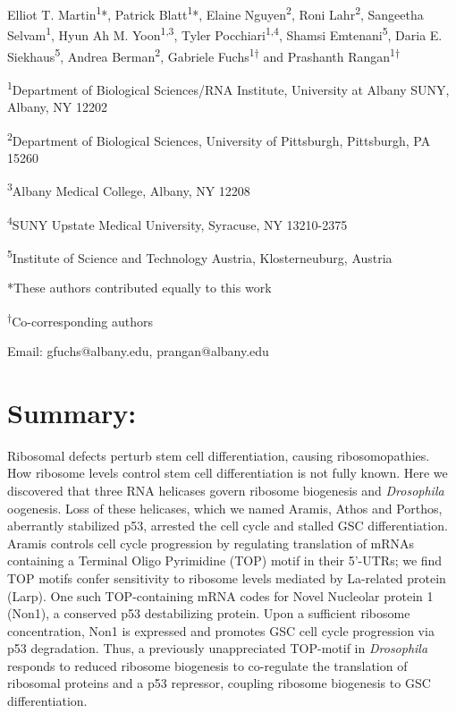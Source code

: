\documentclass[12pt,oneside]{reedthesis}
\begin{document}
Elliot T. Martin\textsuperscript{1}*, Patrick Blatt\textsuperscript{1}*, Elaine Nguyen\textsuperscript{2}, Roni Lahr\textsuperscript{2}, Sangeetha Selvam\textsuperscript{1}, Hyun Ah M. Yoon\textsuperscript{1,3}, Tyler Pocchiari\textsuperscript{1,4}, Shamsi Emtenani\textsuperscript{5}, Daria E. Siekhaus\textsuperscript{5}, Andrea Berman\textsuperscript{2}, Gabriele Fuchs\textsuperscript{1†} and Prashanth Rangan\textsuperscript{1†}

\textsuperscript{1}Department of Biological Sciences/RNA Institute, University at Albany SUNY, Albany, NY 12202

\textsuperscript{2}Department of Biological Sciences, University of Pittsburgh, Pittsburgh, PA 15260

\textsuperscript{3}Albany Medical College, Albany, NY 12208

\textsuperscript{4}SUNY Upstate Medical University, Syracuse, NY 13210-2375

\textsuperscript{5}Institute of Science and Technology Austria, Klosterneuburg, Austria

*These authors contributed equally to this work

\textsuperscript{†}Co-corresponding authors

Email: gfuchs@albany.edu, prangan@albany.edu


\hypertarget{summary-1}{%
\section{Summary:}\label{summary-1}}

Ribosomal defects perturb stem cell differentiation, causing ribosomopathies. How ribosome levels control stem cell differentiation is not fully known. Here we discovered that three RNA helicases govern ribosome biogenesis and \emph{Drosophila} oogenesis. Loss of these helicases, which we named Aramis, Athos and Porthos, aberrantly stabilized p53, arrested the cell cycle and stalled GSC differentiation. Aramis controls cell cycle progression by regulating translation of mRNAs containing a Terminal Oligo Pyrimidine (TOP) motif in their 5'-UTRs; we find TOP motifs confer sensitivity to ribosome levels mediated by La-related protein (Larp). One such TOP-containing mRNA codes for {No}vel {N}ucleolar protein 1 (Non1), a conserved p53 destabilizing protein. Upon a sufficient ribosome concentration, Non1 is expressed and promotes GSC cell cycle progression via p53 degradation. Thus, a previously unappreciated TOP-motif in \emph{Drosophila} responds to reduced ribosome biogenesis to co-regulate the translation of ribosomal proteins and a p53 repressor, coupling ribosome biogenesis to GSC differentiation.
\end{document}
